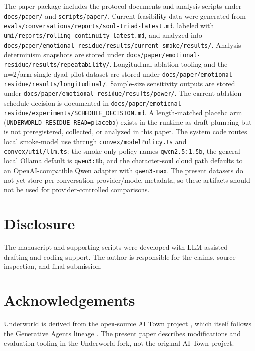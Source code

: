 \documentclass[11pt]{article}
\begin{document}
The paper package includes the protocol documents and analysis scripts under \texttt{docs/paper/} and \texttt{scripts/paper/}. Current feasibility data were generated from \texttt{evals/conversations/reports/soul-triad-latest.md}, labeled with \texttt{umi/reports/rolling-continuity-latest.md}, and analyzed into \texttt{docs/paper/emotional-residue/results/current-smoke/results/}. Analysis determinism snapshots are stored under \texttt{docs/paper/emotional-residue/results/repeatability/}. Longitudinal ablation tooling and the n=2/arm single-dyad pilot dataset are stored under \texttt{docs/paper/emotional-residue/results/longitudinal/}. Sample-size sensitivity outputs are stored under \texttt{docs/paper/emotional-residue/results/power/}. The current ablation schedule decision is documented in \texttt{docs/paper/emotional-residue/experiments/SCHEDULE_DECISION.md}. A length-matched placebo arm (\texttt{UNDERWORLD\_RESIDUE\_READ=placebo}) exists in the runtime as draft plumbing but is not preregistered, collected, or analyzed in this paper. The system code routes local smoke-model use through \texttt{convex/modelPolicy.ts} and \texttt{convex/util/llm.ts}: the smoke-only policy names \texttt{qwen2.5:1.5b}, the general local Ollama default is \texttt{qwen3:8b}, and the character-soul cloud path defaults to an OpenAI-compatible Qwen adapter with \texttt{qwen3-max}. The present datasets do not yet store per-conversation provider/model metadata, so these artifacts should not be used for provider-controlled comparisons.

\section*{Disclosure}

The manuscript and supporting scripts were developed with LLM-assisted drafting and coding support. The author is responsible for the claims, source inspection, and final submission.

\section*{Acknowledgements}

Underworld is derived from the open-source AI Town project \cite{aitown}, which itself follows the Generative Agents lineage \cite{park2023generative}. The present paper describes modifications and evaluation tooling in the Underworld fork, not the original AI Town project.
\end{document}
